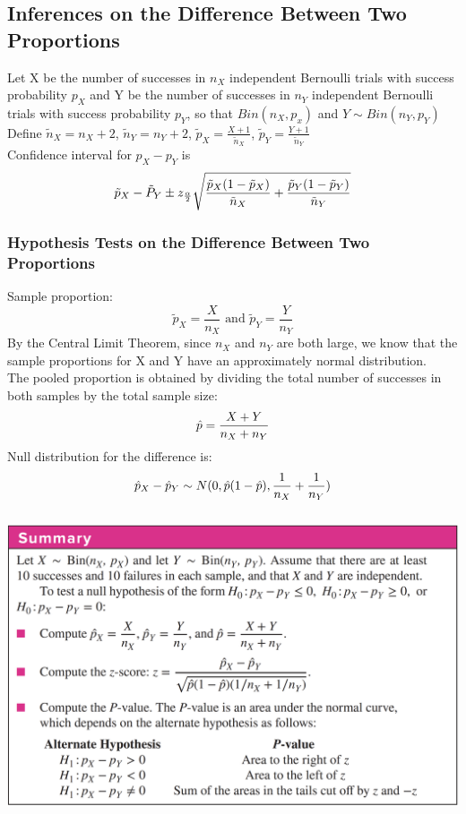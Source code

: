 \documentclass[../main.tex]{subfiles}
\begin{document}
\subsection{Inferences on the Difference Between Two Proportions}
Let X be the number of successes in $n_X$ independent Bernoulli trials with success probability $p_X$ and Y be the number of successes in $n_Y$ independent Bernoulli trials with success probability $p_Y$, so that \xsim $Bin(n_X,p_x)$ and $Y\sim Bin(n_Y,p_Y) $\\
Define $\tilde{n}_X=n_X+2$, $\tilde{n}_Y=n_Y+2$, $\tilde{p}_X=\frac{X+1}{\tilde{n}_X}$, $\tilde{p}_Y=\frac{Y+1}{\tilde{n}_Y}$ \\
Confidence interval for $p_X-p_Y$ is
\begin{equation*}
    \tilde{p}_X-\tilde{P}_{Y} \pm z_{\frac{\alpha}{2}} \sqrt{\frac{\tilde{p}_X(1-\tilde{p}_X)}{\tilde{n}_X}+\frac{\tilde{p}_Y(1-\tilde{p}_Y)}{\tilde{n}_Y}}
\end{equation*}
\subsubsection*{Hypothesis Tests on the Difference Between Two Proportions}
Sample proportion:
\[ \tilde{p}_X=\frac{X}{n_X} \mbox{ and  }\tilde{p}_Y=\frac{Y}{n_Y} \]
By the Central Limit Theorem, since $n_X$ and $n_Y$ are both large, we know that the sample proportions for X and Y have an approximately normal distribution.\\
The pooled proportion is obtained by dividing the total number of successes in both samples by the total sample size:
\[
\hat{p} = \frac{X+Y}{n_X+n_Y}\]
Null distribution for the difference is:
\[
\hat{p}_X-\hat{p}_{Y} \sim  N(0, \hat{p}(1-\hat{p}) , {\frac{1}{n_X}+\frac{1}{n_Y}})
\]
\\
\includegraphics[width = 15cm]{Sections/Image/7_2summary.png}
\end{document}
